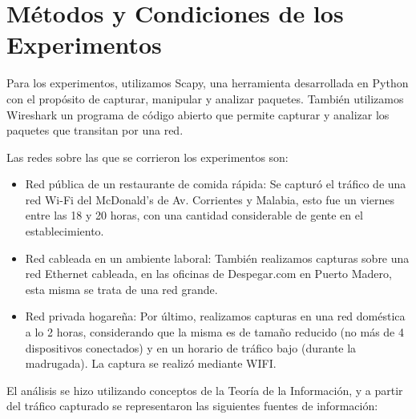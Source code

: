 \section{Métodos y Condiciones de los Experimentos}

Para los experimentos, utilizamos Scapy, una herramienta desarrollada en Python con el propósito de capturar, manipular y analizar paquetes. También utilizamos Wireshark un programa de código abierto que permite capturar y analizar los paquetes que transitan por una red.

Las redes sobre las que se corrieron los experimentos son:

\begin{itemize}

  \item Red pública de un restaurante de comida rápida: Se capturó el tráfico de una red Wi-Fi del McDonald's de Av. Corrientes y Malabia, esto fue un viernes entre las 18 y 20 horas, con una cantidad considerable de gente en el establecimiento.
  
  \item Red cableada en un ambiente laboral: También realizamos capturas sobre una red Ethernet cableada, en las oficinas de Despegar.com en Puerto Madero, esta misma se trata de una red grande.
  
  \item Red privada hogareña: Por último, realizamos capturas en una red doméstica a lo 2 horas, considerando que la misma es de tamaño reducido (no más de 4 dispositivos conectados) y en un horario de tráfico bajo (durante la madrugada). La captura se realizó mediante WIFI.

\end{itemize}

El análisis se hizo utilizando conceptos de la Teoría de la Información, y a partir del tráfico capturado se representaron las siguientes fuentes de información:

